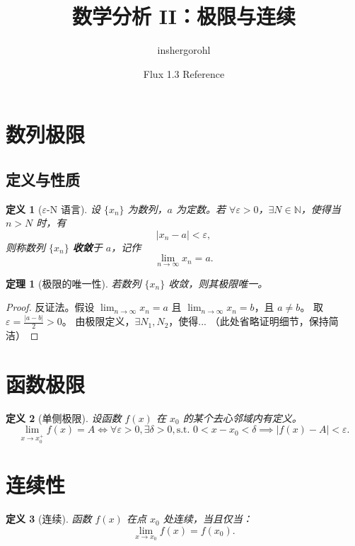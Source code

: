 \documentclass[12pt, a4paper]{article}
\newtheorem{definition}{定义}[section]
\newtheorem{theorem}{定理}[section]
\newcommand{\N}{\mathbb{N}} %
\newcommand{\limn}{\lim_{n \to \infty}} %
\begin{document}
\title{数学分析 II：极限与连续}
\author{inshergorohl}
\date{Flux 1.3 Reference}
\maketitle

\section{数列极限}
\subsection{定义与性质}

\begin{definition}[$\varepsilon$-N 语言]
设 $\{x_n\}$ 为数列，$a$ 为定数。若 $\forall \varepsilon > 0$，$\exists N \in \N$，使得当 $n > N$ 时，有
\[
|x_n - a| < \varepsilon,
\]
则称数列 $\{x_n\}$ \textbf{收敛}于 $a$，记作
\[
\limn x_n = a.
\]
\end{definition}

\begin{theorem}[极限的唯一性]
若数列 $\{x_n\}$ 收敛，则其极限唯一。
\end{theorem}

\begin{proof}
反证法。假设 $\limn x_n = a$ 且 $\limn x_n = b$，且 $a \neq b$。
取 $\varepsilon = \frac{|a-b|}{2} > 0$。
由极限定义，$\exists N_1, N_2$，使得...
（此处省略证明细节，保持简洁）
\end{proof}

\section{函数极限}

\begin{definition}[单侧极限]
设函数 $f(x)$ 在 $x_0$ 的某个去心邻域内有定义。
\[
\lim_{x \to x_0^+} f(x) = A \iff \forall \varepsilon > 0, \exists \delta > 0, \text{s.t. } 0 < x - x_0 < \delta \implies |f(x)-A|<\varepsilon.
\]
\end{definition}

\section{连续性}

\begin{definition}[连续]
函数 $f(x)$ 在点 $x_0$ 处连续，当且仅当：
\[
\lim_{x \to x_0} f(x) = f(x_0).
\]
\end{definition}
\end{document}
